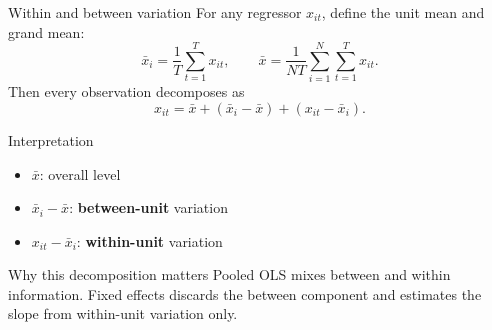 \documentclass[10pt]{beamer}
\begin{document}
\begin{frame}{Within and between variation}
\label{slide:withinbetween}
\small
For any regressor $x_{it}$, define the unit mean and grand mean:
\[
\bar{x}_i = \frac{1}{T}\sum_{t=1}^T x_{it},
\qquad
\bar{x} = \frac{1}{NT}\sum_{i=1}^N \sum_{t=1}^T x_{it}.
\]
Then every observation decomposes as
\[
x_{it} = \bar{x} + (\bar{x}_i-\bar{x}) + (x_{it}-\bar{x}_i).
\]

\pause
\begin{block}{Interpretation}
\begin{itemize}
  \item $\bar{x}$: overall level
  \item $\bar{x}_i - \bar{x}$: \textbf{between-unit} variation
  \item $x_{it} - \bar{x}_i$: \textbf{within-unit} variation
\end{itemize}
\end{block}

\pause
\begin{alertblock}{Why this decomposition matters}
Pooled OLS mixes between and within information. Fixed effects discards the between component and estimates the slope from within-unit variation only.
\end{alertblock}
\end{frame}
\end{document}
